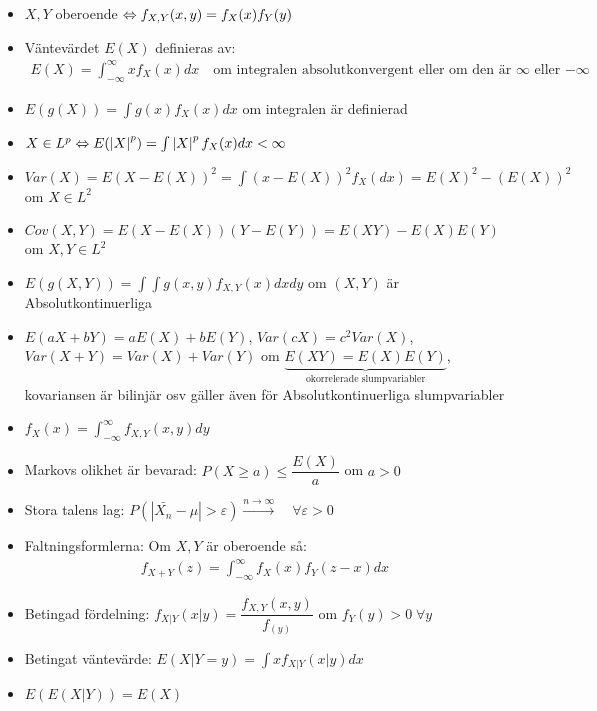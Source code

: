 \begin{itemize}
  \item $X,Y$ oberoende $\Leftrightarrow f_{X,Y}(x,y)= f_X(x)f_Y(y)$ 
  \item Väntevärdet $E(X)$ definieras av:
    \begin{equation*}
      \begin{gathered}
        E(X) = \int_{-\infty}^{\infty}xf_X(x)dx\quad\text{om integralen absolutkonvergent eller om den är $\infty$ eller $-\infty$}
      \end{gathered}
    \end{equation*}
  \item $E(g(X)) = \int g(x)f_X(x)dx$ om integralen är definierad
  \item $X\in L^p\Leftrightarrow E(\left|X\right|^p) = \int\left|X\right|^pf_X(x)dx<\infty$
  \item $Var(X) = E(X-E(X))^2 = \int(x-E(X))^2f_X(dx) = E(X)^2-(E(X))^2$ om $X\in L^2$
  \item $Cov(X,Y) = E(X-E(X))(Y-E(Y)) = E(XY)-E(X)E(Y)$ om $X,Y\in L^2$
  \item $E(g(X,Y)) = \int\int g(x,y)f_{X,Y}(x)dxdy$ om $(X,Y)$ är Absolutkontinuerliga
  \item $E(aX+bY) = aE(X)+bE(Y)$, $Var(cX) = c^2Var(X)$, $Var(X+Y) = Var(X)+Var(Y)$ om $\underbrace{E(XY) = E(X)E(Y)}_{\text{okorrelerade slumpvariabler}}$, kovariansen är bilinjär osv gäller även för Absolutkontinuerliga slumpvariabler
  \item $f_X(x) = \int_{-\infty}^{\infty} f_{X,Y}(x,y)dy$ 
  \item Markovs olikhet är bevarad: $P(X\geq a)\leq \dfrac{E(X)}{a}$ om $a>0$
  \item Stora talens lag: $P(\left|\bar{X_n}-\mu\right|>\varepsilon)\stackrel{n\to\infty}{\to}\quad\forall\varepsilon>0$
  \item Faltningsformlerna: Om $X,Y$ är oberoende så:
    \begin{equation*}
      \begin{gathered}
        f_{X+Y}(z) = \int_{-\infty}^{\infty}f_X(x)f_Y(z-x)dx
      \end{gathered}
    \end{equation*}
  \item Betingad fördelning: $f_{X|Y}(x|y) = \dfrac{f_{X,Y}(x,y)}{f_(y)}$ om $f_Y(y)>0\;\forall y$
  \item Betingat väntevärde: $E(X|Y = y) = \int xf_{X|Y}(x|y)dx$
  \item $E(E(X|Y)) = E(X)$
\end{itemize}

